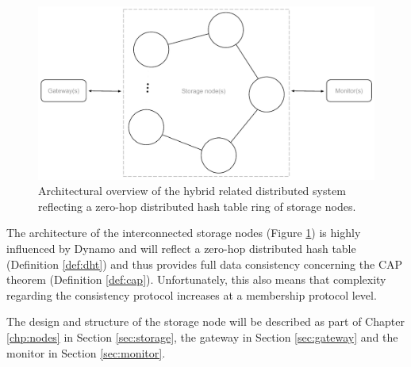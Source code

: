 \begin{figure}[h!]
	\centering
	\includegraphics[scale=0.7]{pdf/architecture-overview.pdf}
	\caption[Architectural overview]{Architectural overview of the hybrid related distributed system reflecting a zero-hop distributed hash table ring of storage nodes. \label{fig:architecture-overview}}
\end{figure}

The architecture of the interconnected storage nodes (Figure \ref{fig:architecture-overview}) is highly influenced by Dynamo and will reflect a zero-hop distributed hash table (Definition \ref{def:dht}) and thus provides full data consistency concerning the CAP theorem (Definition \ref{def:cap}). Unfortunately, this also means that complexity regarding the consistency protocol increases at a membership protocol level.
\newline

The design and structure of the storage node will be described as part of Chapter \ref{chp:nodes} in Section \ref{sec:storage}, the gateway in Section \ref{sec:gateway} and the monitor in Section \ref{sec:monitor}.
\newpage

